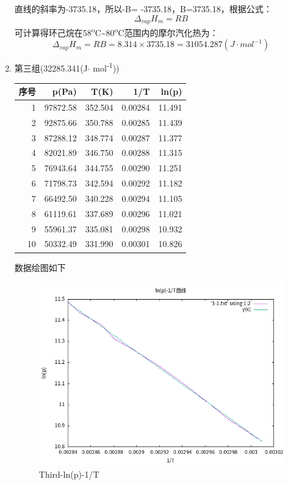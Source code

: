 \documentclass[11pt]{report}
\begin{document}
\begin{enumerate}
\begin{verbatim}
\end{verbatim}
直线的斜率为-3735.18，所以-B= -3735.18，B=3735.18，根据公式：
\[
     \Delta_{vap}H_{m}=RB
     \]
可计算得环己烷在58\textsuperscript{o}C\textasciitilde{}80\textsuperscript{o}C范围内的摩尔汽化热为：
\[
     \Delta_{vap}H_{m}=RB=8.314\times 3735.18=31054.287(J\cdot mol^{-1})
     \]
\item 第三组(32285.341(J\(\cdot\) mol\textsuperscript{-1}))
\label{sec:orgd7bee62}
\begin{center}
\begin{tabular}{rrrrr}
序号 & p(Pa) & T(K) & 1/T & ln(p)\\
\hline
1 & 97872.58 & 352.504 & 0.00284 & 11.491\\
2 & 92875.66 & 350.788 & 0.00285 & 11.439\\
3 & 87288.12 & 348.774 & 0.00287 & 11.377\\
4 & 82021.89 & 346.750 & 0.00288 & 11.315\\
5 & 76943.64 & 344.755 & 0.00290 & 11.251\\
6 & 71798.73 & 342.594 & 0.00292 & 11.182\\
7 & 66492.50 & 340.228 & 0.00294 & 11.105\\
8 & 61119.61 & 337.689 & 0.00296 & 11.021\\
9 & 55961.37 & 335.081 & 0.00298 & 10.932\\
10 & 50332.49 & 331.990 & 0.00301 & 10.826\\
\end{tabular}
\end{center}
数据绘图如下
\begin{figure}[htbp]
\centering
\includegraphics[width=.9\linewidth]{../data/3-1.png}
\caption{Third-ln(p)-1/T}
\end{figure}


\end{enumerate}
\end{document}

